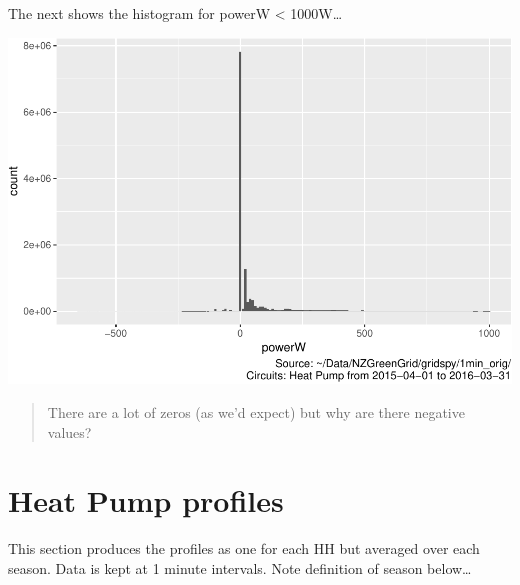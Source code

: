 \documentclass[]{article}
\begin{document}
The next shows the histogram for powerW \textless{} 1000W\ldots{}

\includegraphics{ggHeatPumpProfiles_files/figure-latex/histo power under 1000-1.pdf}

\begin{quote}
There are a lot of zeros (as we'd expect) but why are there negative
values?
\end{quote}

\section{Heat Pump profiles}\label{heat-pump-profiles}

This section produces the profiles as one for each HH but averaged over
each season. Data is kept at 1 minute intervals. Note definition of
season below\ldots{}
\end{document}
